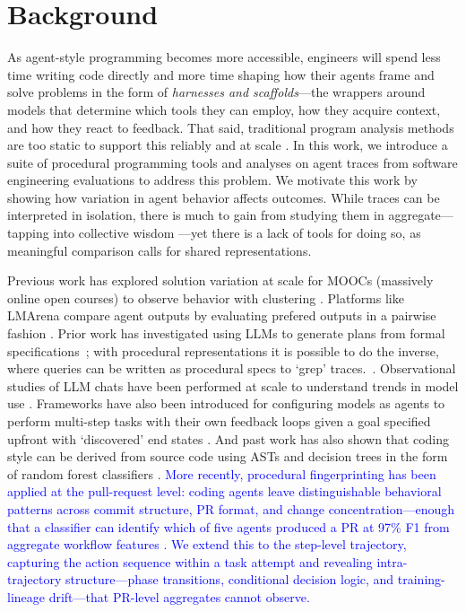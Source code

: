 \documentclass[11pt]{article}
\begin{document}
\section{Background}

As agent-style programming becomes more accessible, engineers will spend less time writing code directly and more time shaping how their agents frame and solve problems in the form of \emph{harnesses and scaffolds}---the wrappers around models that determine which tools they can employ, how they acquire context, and how they react to feedback. That said, traditional program analysis methods are too static to support this reliably and at scale \cite{jimenez2024swebenchlanguagemodelsresolve, yang2024sweagentagentcomputerinterfacesenable, chen2021evaluatinglargelanguagemodels, austin2021programsynthesislargelanguage}. In this work, we introduce a suite of procedural programming tools and analyses on agent traces from software engineering evaluations to address this problem. We motivate this work by showing how variation in agent behavior affects outcomes. While traces can be interpreted in isolation, there is much to gain from studying them in aggregate---tapping into collective wisdom \cite{surowiecki2004wisdom, Alizadeh_2015}---yet there is a lack of tools for doing so, as meaningful comparison calls for shared representations.

Previous work has explored solution variation at scale for MOOCs (massively online open courses) to observe behavior with clustering \cite{glassman2015overcode}. Platforms like LMArena compare agent outputs by evaluating prefered outputs in a pairwise fashion \cite{chiang2024chatbotarenaopenplatform}. Prior work has investigated using LLMs to generate plans from formal specifications~\cite{silver2024generalized}; with procedural representations it is possible to do the inverse, where queries can be written as procedural specs to `grep' traces.~\cite{yin2017syntacticneuralmodelgeneralpurpose}. Observational studies of LLM chats have been performed at scale to understand trends in model use \cite{tamkin2024clioprivacypreservinginsightsrealworld, deming2025how}. Frameworks have also been introduced for configuring models as agents to perform multi-step tasks with their own feedback loops given a goal specified upfront with `discovered' end states \cite{yao2023reactsynergizingreasoningacting}. And past work has also shown that coding style can be derived from source code using ASTs and decision trees in the form of random forest classifiers \cite{code_stylometry}. \textcolor{blue}{More recently, procedural fingerprinting has been applied at the pull-request level: coding agents leave distinguishable behavioral patterns across commit structure, PR format, and change concentration---enough that a classifier can identify which of five agents produced a PR at 97\% F1 from aggregate workflow features \cite{bisztray2025iknowllmwrote}. We extend this to the step-level trajectory, capturing the action sequence within a task attempt and revealing intra-trajectory structure---phase transitions, conditional decision logic, and training-lineage drift---that PR-level aggregates cannot observe.}
\end{document}
